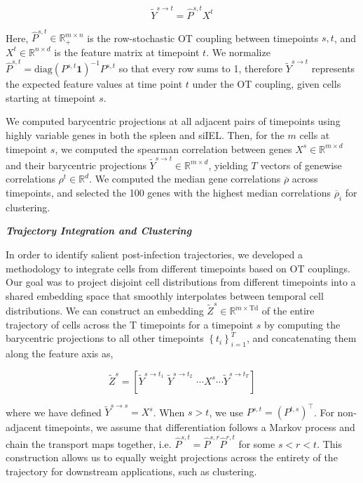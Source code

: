 \[{\widetilde{Y}}^{s \rightarrow t} = {\widehat{P}}^{s,t}X^{t}\]

Here, \({\widehat{P}}^{s,t} \in \mathbb{R}_{+}^{m \times n}\) is the
row-stochastic OT coupling between timepoints \(s,t\), and
\(X^{t} \in \mathbb{R}^{n \times d}\) is the feature matrix at timepoint
\(t\). We normalize
\({\widehat{P}}^{s,t} = \mathrm{\text{diag}}\left( P^{s,t}\mathbf{1} \right)^{- 1}P^{s,t}\)
so that every row sums to 1, therefore
\({\widetilde{Y}}^{s \rightarrow t}\) represents the expected feature
values at time point \(t\) under the OT coupling, given cells starting
at timepoint \(s\).

We computed barycentric projections at all adjacent pairs of timepoints
using highly variable genes in both the spleen and siIEL. Then, for the
\(m\) cells at timepoint \(s\), we computed the spearman correlation
between genes \(X^{s} \in \mathbb{R}^{m \times d}\) and their
barycentric projections
\({\widetilde{Y}}^{s \rightarrow t} \in \mathbb{R}^{m \times d}\),
yielding \(T\) vectors of genewise correlations
\(\rho^{t} \in \mathbb{R}^{d}\). We computed the median gene
correlations \(\overline{\rho}\) across timepoints, and selected the 100
genes with the highest median correlations \({\overline{\rho}}_{i}\) for
clustering.

\emph{\textbf{Trajectory Integration and Clustering}}

In order to identify salient post-infection trajectories, we developed a
methodology to integrate cells from different timepoints based on OT
couplings. Our goal was to project disjoint cell distributions from
different timepoints into a shared embedding space that smoothly
interpolates between temporal cell distributions. We can construct an
embedding \({\widetilde{Z}}^{s} \in \mathbb{R}^{m \times \text{Td}}\) of
the entire trajectory of cells across the T timepoints for a timepoint
\(s\) by computing the barycentric projections to all other timepoints
\(\left\{ t_{i} \right\}_{i = 1}^{T}\), and concatenating them along the
feature axis as,

\[{\widetilde{Z}}^{s} = \left\lbrack {\widetilde{Y}}^{s \rightarrow t_{1}}\mspace{6mu}{\widetilde{Y}}^{s \rightarrow t_{2}}\mspace{6mu}\cdots X^{s}\cdots{\widetilde{Y}}^{s \rightarrow t_{T}} \right\rbrack\]

where we have defined \({\widetilde{Y}}^{s \rightarrow s} = X^{s}\).
When \(s > t\), we use \(P^{s,t} = \left( P^{t,s} \right)^{\top}\). For
non-adjacent timepoints, we assume that differentiation follows a Markov
process and chain the transport maps together, i.e.
\({\widehat{P}}^{s,t} = {\widehat{P}}^{s,r}{\widehat{P}}^{r,t}\) for
some \(s < r < t\). This construction allows us to equally weight
projections across the entirety of the trajectory for downstream
applications, such as clustering.

